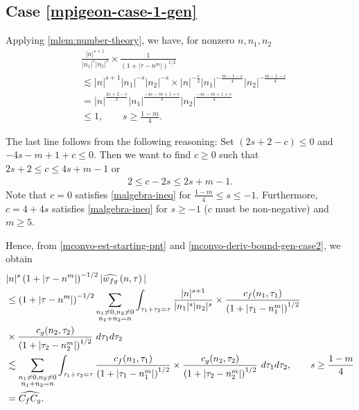 \subsection{Case \texorpdfstring{\eqref{mpigeon-case-1-gen}}{1}}
Applying \cref{mlem:number-theory}, we have, for nonzero $ n, n_1, n_2 $
%
\begin{equation}
	\label{mconvo-deriv-bound-gen-case2}
	\begin{split}
		& \frac{|n|^{s+1}}{|n_1|^s 
		| n_2|^s}
		\times
		\frac{1}{(1 + | \tau -n^m |)^{1/2}}
		\\
		& \lesssim | n |^{s+1}| n_1 |^{-s}| n_2 |^{-s} \times | n
		|^{-\frac{c}{2}}| n_1 |^{-\frac{m-1-c}{4}}| n_2 |^{-\frac{m-1-c}{4}} 
		\\
		& = | n |^{\frac{2s+2 -c}{2}} | n_1 |^{\frac{-4s -m + 1+ c}{4}} | n_2
		|^\frac{-4s -m + 1+ c}{4}
		\\
		& \le 1, \qquad s \ge \frac{1-m}{4}.
	\end{split}  
\end{equation}
%
%
\begin{framed}
\begin{remark}
	\label{mrem:gen-s-val}
	 The last line follows from the following reasoning: Set $(2s + 2 -c) \le
0$ and $-4s -m +1 +c \le 0$. Then we want to find $c \ge 0$ such that $2s +2 \le c \le
4s + m-1$ or 
%
%
\begin{equation}
	\label{malgebra-ineq}
	\begin{split}
		2 \le c - 2s \le 2s + m-1.
	\end{split}
\end{equation}
%
%
Note that $c=0$ satisfies \eqref{malgebra-ineq} for $\frac{1-m}{4} \le s \le
-1$. Furthermore, $c = 4 + 4s$ satisfies \eqref{malgebra-ineq} for $s \ge -1$ ($c$ must be non-negative) and $m \ge 5$. 
\end{remark}
\end{framed}
%
Hence, from \eqref{mconvo-est-starting-pnt} and
\eqref{mconvo-deriv-bound-gen-case2},
we obtain 
\begin{equation}
	\label{mconvo-est-starting-pnt-gen-case2}
	\begin{split}
		 & |n|^s \left( 1 + | \tau - n^m | \right)^{-1/2} | \widehat{w_{fg}}\left( 
		n, \tau \right) |
		\\
		& \le \left( 1 + | \tau - n^m | \right)^{-1/2}
		\sum_{\substack{n_1 \neq0, n_2 \neq 0 \\n_1 + n_2 =n}} \int_{\tau_1 + \tau_2 = \tau}\frac{|n|^{s+1}}{|n_1|^s | n_2|^s} 
		\times \frac{c_f(n_1, \tau_1)}{\left( 1 + | \tau_1 - n_1^m | 
		\right)^{1/2}}
		\\
		& \times
		\frac{c_g(n_2, \tau_2)}{\left( 1 + | \tau_2 - n_2^m | 
		\right)^{1/2}}\ d \tau_1 d \tau_2
		\\
		& \lesssim \sum_{\substack{n_1 \neq0, n_2 \neq 0 \\n_1 + n_2 =n}} \int_{\tau_1 + \tau_2 = \tau}\frac{c_f(n_1, \tau_1)}{\left( 1 + | \tau_1 - n_1^m | 
		\right)^{1/2}} \times
		\frac{c_g(n_2, \tau_2)}{\left( 1 + | \tau_2 - n_2^m | 
		\right)^{1/2}}\ d \tau_1 d \tau_2, \qquad s \ge \frac{1-m}{4}
		\\
		& = \widehat{{C_f} C_g}.
	\end{split}
\end{equation}

